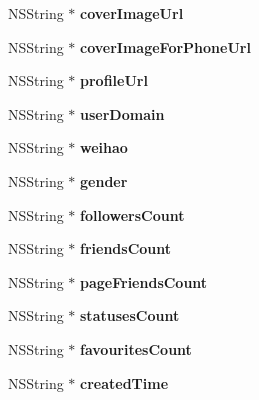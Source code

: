 \begin{DoxyCompactItemize}
N\+S\+String $\ast$ {\bfseries cover\+Image\+Url}
\item 
\mbox{\label{interface_weibo_user_adfe16e755d2c3263be878ec1f6c2225b}} 
N\+S\+String $\ast$ {\bfseries cover\+Image\+For\+Phone\+Url}
\item 
\mbox{\label{interface_weibo_user_ac67ffc0b56fd5bd73acabb873a01bbbc}} 
N\+S\+String $\ast$ {\bfseries profile\+Url}
\item 
\mbox{\label{interface_weibo_user_a696cd61aa4f4e2dd537a95eb32621cdb}} 
N\+S\+String $\ast$ {\bfseries user\+Domain}
\item 
\mbox{\label{interface_weibo_user_a5bde71e1aeac3352b66072c8b10dbc2a}} 
N\+S\+String $\ast$ {\bfseries weihao}
\item 
\mbox{\label{interface_weibo_user_ae3aa8ea14337118f60ccfb4c6b2ac9ea}} 
N\+S\+String $\ast$ {\bfseries gender}
\item 
\mbox{\label{interface_weibo_user_a2731573fabed76b1f07083f154ee23ab}} 
N\+S\+String $\ast$ {\bfseries followers\+Count}
\item 
\mbox{\label{interface_weibo_user_ac8dd082be80e43f15f264f565c99547a}} 
N\+S\+String $\ast$ {\bfseries friends\+Count}
\item 
\mbox{\label{interface_weibo_user_aae190d3a9fa6ed17f27507f31433f1a8}} 
N\+S\+String $\ast$ {\bfseries page\+Friends\+Count}
\item 
\mbox{\label{interface_weibo_user_aa5624a60641d3aa93bc27e2ec8cf4807}} 
N\+S\+String $\ast$ {\bfseries statuses\+Count}
\item 
\mbox{\label{interface_weibo_user_a527d3aeb49c53bc6bde48c02bdee7516}} 
N\+S\+String $\ast$ {\bfseries favourites\+Count}
\item 
\mbox{\label{interface_weibo_user_a0d44d8a0aee791fa3f7cdfefc0dfce29}} 
N\+S\+String $\ast$ {\bfseries created\+Time}

\end{DoxyCompactItemize}
